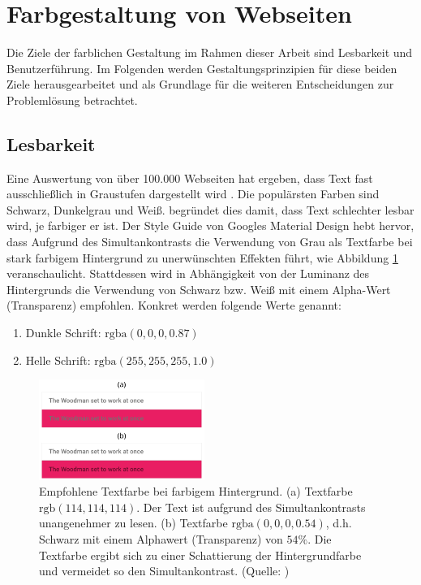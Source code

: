\section{Farbgestaltung von Webseiten}
\label{sec:farbgestaltung}
Die Ziele der farblichen Gestaltung im Rahmen dieser Arbeit sind Lesbarkeit und Benutzerführung. Im Folgenden werden Gestaltungsprinzipien für diese beiden Ziele herausgearbeitet und als Grundlage für die weiteren Entscheidungen zur Problemlösung betrachtet.

\subsection{Lesbarkeit}
\label{sec:lesbarkeit}

Eine Auswertung von über 100.000 Webseiten hat ergeben, dass Text fast ausschließlich in Graustufen dargestellt wird \citep{webzeitgeist}. Die populärsten Farben sind Schwarz, Dunkelgrau und Weiß. \citet{webdesign} begründet dies damit, dass Text schlechter lesbar wird, je farbiger er ist. Der Style Guide von Googles Material Design \citep{google} hebt hervor, dass Aufgrund des Simultankontrasts die Verwendung von Grau als Textfarbe bei stark farbigem Hintergrund zu unerwünschten Effekten führt, wie Abbildung \ref{fig:text_color} veranschaulicht. Stattdessen wird in Abhängigkeit von der Luminanz des Hintergrunds die Verwendung von Schwarz bzw. Weiß mit einem Alpha-Wert (Transparenz) empfohlen. Konkret werden folgende Werte genannt:
\begin{enumerate}
	\item Dunkle Schrift: $\text{rgba}(0, 0, 0, 0.87)$
	\item Helle Schrift: $\text{rgba}(255, 255, 255, 1.0)$
\end{enumerate}

\begin{figure}[h]
	\centering
	\includegraphics[width=0.48\textwidth]{img/text_color.png}
	\caption{Empfohlene Textfarbe bei farbigem Hintergrund. (a) Textfarbe $\text{rgb}(114,114,114)$. Der Text ist aufgrund des Simultankontrasts unangenehmer zu lesen. (b) Textfarbe $\text{rgba}(0, 0, 0, 0.54)$, d.h. Schwarz mit einem Alphawert (Transparenz) von $54\%$. Die Textfarbe ergibt sich zu einer Schattierung der Hintergrundfarbe und vermeidet so den Simultankontrast. (Quelle: \citep{google})}
	\label{fig:text_color}
\end{figure}

